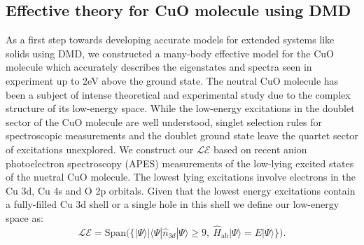 \documentclass[12pt]{article}
\begin{document}
\subsection{Effective theory for CuO molecule using DMD}
As a first step towards developing accurate models for extended systems like solids using DMD, we constructed a many-body effective model for the CuO molecule which accurately describes the eigenstates and spectra seen in experiment up to 2eV above the ground state.
The neutral CuO molecule has been a subject of intense theoretical and experimental study due to the complex structure of its low-energy space.
While the low-energy excitations in the doublet sector of the CuO molecule are well understood, singlet selection rules for spectroscopic measurements and the doublet ground state leave the quartet sector of excitations unexplored.
We construct our $\mathcal{LE}$ based on recent anion photoelectron spectroscopy (APES) measurements of the low-lying excited states of the nuetral CuO molecule. 
The lowest lying excitations involve electrons in the Cu 3d, Cu 4s and O 2p orbitals.
Given that the lowest energy excitations contain a fully-filled Cu 3d shell or a single hole in this shell we define our low-energy space as:
\begin{equation}
\mathcal{LE} = \text{Span(}\{ |\Psi \rangle | \langle \Psi | \hat{n}_{3d} | \Psi \rangle \ge 9,\ \hat{H}_\text{ab}|\Psi\rangle = E |\Psi\rangle \}\text{)}.
\label{eq:LE}
\end{equation}
\end{document}
